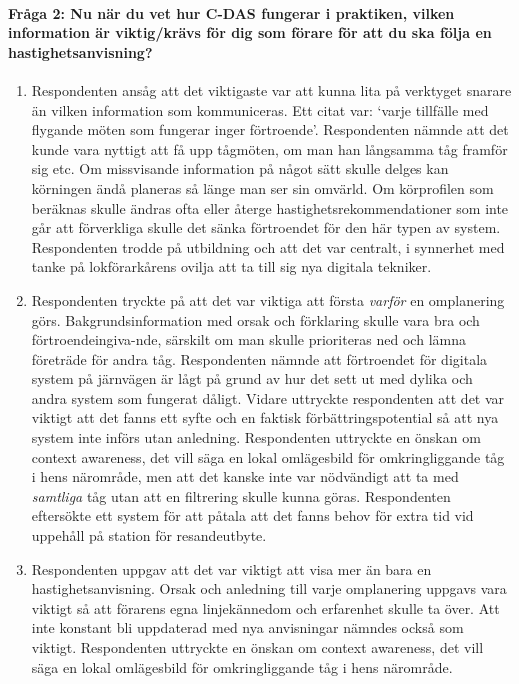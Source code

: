 \paragraph{Fråga 2: Nu när du vet hur C-DAS fungerar i praktiken, vilken information är viktig/krävs för dig som förare för att du ska följa en hastighetsanvisning?}
\begin{enumerate}
    \item Respondenten ansåg att det viktigaste var att kunna lita på verktyget snarare än vilken information som kommuniceras.
    Ett citat var: \lq{}varje tillfälle med flygande möten som fungerar inger förtroende\rq{}.
    Respondenten nämnde att det kunde vara nyttigt att få upp tågmöten, om man han långsamma tåg framför sig etc.
    Om missvisande information på något sätt skulle delges kan körningen ändå planeras så länge man ser sin omvärld.
    Om körprofilen som beräknas skulle ändras ofta eller återge hastighetsrekommendationer som inte går att förverkliga skulle det sänka förtroendet för den här typen av system.
    Respondenten trodde på utbildning och att det var centralt, i synnerhet med tanke på lokförarkårens ovilja att ta till sig nya digitala tekniker.
    \item Respondenten tryckte på att det var viktiga att första \emph{varför} en omplanering görs.
    Bakgrundsinformation med orsak och förklaring skulle vara bra och förtroendeingiva-nde, särskilt om man skulle prioriteras ned och lämna företräde för andra tåg.
    Respondenten nämnde att förtroendet för digitala system på järnvägen är lågt på grund av hur det sett ut med dylika och andra system som fungerat dåligt.
    Vidare uttryckte respondenten att det var viktigt att det fanns ett syfte och en faktisk förbättringspotential så att nya system inte införs utan anledning.
    Respondenten uttryckte en önskan om context awareness, det vill säga en lokal omlägesbild för omkringliggande tåg i hens närområde, men att det kanske inte var nödvändigt att ta med \emph{samtliga} tåg utan att en filtrering skulle kunna göras.
    Respondenten eftersökte ett system för att påtala att det fanns behov för extra tid vid uppehåll på station för resandeutbyte.
    \item Respondenten uppgav att det var viktigt att visa mer än bara en hastighetsanvisning.
    Orsak och anledning till varje omplanering uppgavs vara viktigt så att förarens egna linjekännedom och erfarenhet skulle ta över.
    Att inte konstant bli uppdaterad med nya anvisningar nämndes också som viktigt.
    Respondenten uttryckte en önskan om context awareness, det vill säga en lokal omlägesbild för omkringliggande tåg i hens närområde.

\end{enumerate}
